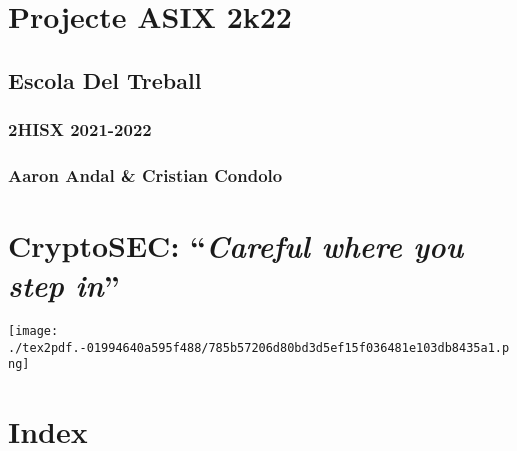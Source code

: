 \documentclass[]{article}
\date{}
\begin{document}
\hypertarget{projecte-asix-2k22}{%
\section{\texorpdfstring{\textbf{Projecte ASIX
2k22}}{Projecte ASIX 2k22}}\label{projecte-asix-2k22}}

\hypertarget{escola-del-treball}{%
\subsection{\texorpdfstring{\textbf{Escola Del
Treball}}{Escola Del Treball}}\label{escola-del-treball}}

\hypertarget{hisx-2021-2022}{%
\subsubsection{\texorpdfstring{\textbf{2HISX
2021-2022}}{2HISX 2021-2022}}\label{hisx-2021-2022}}

\hypertarget{aaron-andal-cristian-condolo}{%
\subsubsection{\texorpdfstring{\textbf{Aaron Andal \& Cristian
Condolo}}{Aaron Andal \& Cristian Condolo}}\label{aaron-andal-cristian-condolo}}

\hypertarget{cryptosec-careful-where-you-step-in}{%
\section{\texorpdfstring{\textbf{CryptoSEC}: ``\emph{Careful where you
step
in}''}{CryptoSEC: ``Careful where you step in''}}\label{cryptosec-careful-where-you-step-in}}

\texttt{[image: ./tex2pdf.-01994640a595f488/785b57206d80bd3d5ef15f036481e103db8435a1.png]}

\hypertarget{index}{%
\section{\texorpdfstring{\textbf{Index}}{Index}}\label{index}}
\end{document}
